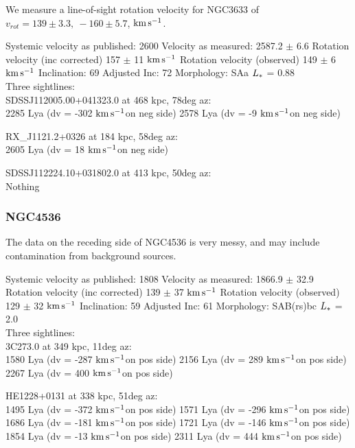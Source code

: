 \documentclass[iop]{emulateapj-rtx4}
\newcommand{\kms}{$\rm km\, s^{-1}$}
\begin{document}
We measure a line-of-sight rotation velocity for NGC3633 of $v_{rot}=139\pm 3.3,~-160\pm5.7$,  \kms.


Systemic velocity as published: 2600
Velocity as measured: 2587.2 $\pm$ 6.6
Rotation velocity (inc corrected) 157 $\pm$ 11 \kms
Rotation velocity (observed) 149 $\pm$ 6 \kms
Inclination: 69
Adjusted Inc: 72
Morphology: SAa
$L_{\**}$ = 0.88 \\

Three sightlines: \\
SDSSJ112005.00+041323.0 at 468 kpc, 78deg az: \\
2285 Lya (dv = -302 \kms on neg side)
2578 Lya (dv = -9 \kms on neg side)


RX\_J1121.2+0326 at 184 kpc, 58deg az: \\
2605 Lya (dv = 18 \kms on neg side)


SDSSJ112224.10+031802.0 at 413 kpc, 50deg az: \\
Nothing


\subsubsection{NGC4536}
The data on the receding side of NGC4536 is very messy, and may include contamination from background sources. 



Systemic velocity as published: 1808
Velocity as measured: 1866.9 $\pm$ 32.9
Rotation velocity (inc corrected) 139 $\pm$ 37 \kms
Rotation velocity (observed) 129 $\pm$ 32 \kms
Inclination: 59
Adjusted Inc: 61
Morphology: SAB(rs)bc
$L_{\**}$ = 2.0 \\

Three sightlines: \\
3C273.0 at 349 kpc, 11deg az: \\
1580 Lya (dv = -287 \kms on pos side)
2156 Lya (dv = 289 \kms on pos side)
2267 Lya (dv = 400 \kms on pos side)


HE1228+0131 at 338 kpc, 51deg az: \\
1495 Lya (dv = -372 \kms on pos side)
1571 Lya (dv = -296 \kms on pos side)
1686 Lya (dv = -181 \kms on pos side)
1721 Lya (dv = -146 \kms on pos side)
1854 Lya (dv = -13 \kms on pos side)
2311 Lya (dv = 444 \kms on pos side)
\end{document}
